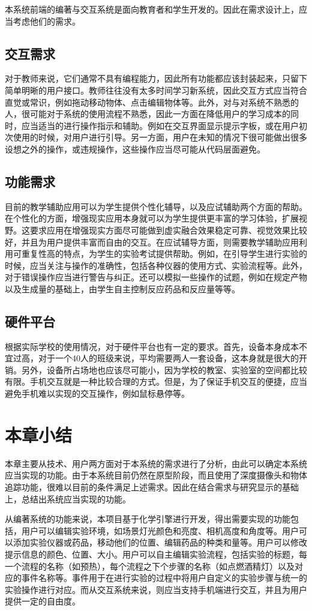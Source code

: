 本系统前端的编著与交互系统是面向教育者和学生开发的。因此在需求设计上，应当考虑他们的需求。

\subsection{交互需求}
对于教师来说，它们通常不具有编程能力，因此所有功能都应该封装起来，只留下简单明晰的用户接口。教师往往没有太多时间学习新系统，因此交互方式应当符合直觉或常识，例如拖动移动物体、点击编辑物体等。此外，对与对系统不熟悉的人，很可能对于系统的使用流程不熟悉，因此一方面在降低用户的学习成本的同时，应当适当的进行操作指示和辅助。例如在交互界面显示提示字板，或在用户初次使用的时候，对用户进行引导。另一方面，用户在未知的情况下很可能做出很多设想之外的操作，或违规操作，这些操作应当尽可能从代码层面避免。

\subsection{功能需求}
目前的教学辅助应用可以为学生提供个性化辅导，以及应试辅助两个方面的帮助。在个性化的方面，增强现实应用本身就可以为学生提供更丰富的学习体验，扩展视野。这要求应用在增强现实方面尽可能做到虚实融合效果稳定可靠、视觉效果比较好，并且为用户提供丰富而自由的交互。在应试辅导方面，则需要教学辅助应用利用可重复性高的特点，为学生的实验考试提供帮助。例如，在引导学生进行实验的时候，应当关注与操作的准确性，包括各种仪器的使用方式、实验流程等。此外，对于错误操作应当进行警告与纠正。还可以模拟一些操作的试题，例如在规定产物以及生成量的基础上，由学生自主控制反应药品和反应量等等。

\subsection{硬件平台}
根据实际学校的使用情况，对于硬件平台也有一定的要求。首先，设备本身成本不宜过高，对于一个40人的班级来说，平均需要两人一套设备，这本身就是很大的开销。另外，设备所占场地也应该尽可能小，因为学校的教室、实验室的空间都比较有限。手机交互就是一种比较合理的方式。但是，为了保证手机交互的便捷，应当避免手机难以实现的交互操作，例如鼠标悬停等。


\section{本章小结}
本章主要从技术、用户两方面对于本系统的需求进行了分析，由此可以确定本系统应当实现的功能。由于本系统目前仍然在原型阶段，而且使用了深度摄像头和物体追踪功能，很难以目前的条件满足上述需求。因此在结合需求与研究显示的基础上，总结出系统应当实现的功能。

从编著系统的功能来说，本项目基于化学引擎进行开发，得出需要实现的功能包括，用户可以编辑实验环境，如场景灯光颜色和亮度、相机高度和角度等。用户可以添加实验仪器或药品，移动他们的位置、编辑药品的种类和量等。用户可以修改提示信息的颜色、位置、大小。用户可以自主编辑实验流程，包括实验的标题，每一个流程的名称（如预热），每个流程之下个步骤的名称（如点燃酒精灯）以及对应的事件名称等。事件用于在进行实验的过程中将用户自定义的实验步骤与统一的实验操作进行对应。而从交互系统来说，则应当支持手机端进行交互，并且为用户提供一定的自由度。
